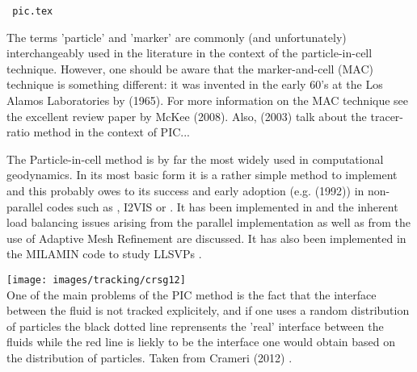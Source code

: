 \begin{flushright} {\tiny \tt {\color{gray} pic.tex}} \end{flushright}

\begin{remark}
The terms 'particle' and 'marker' are commonly (and unfortunately) interchangeably used in the literature 
in the context of the particle-in-cell technique. However, one should be aware that the marker-and-cell (MAC) 
technique is something different: it was invented in the early 60's at the Los Alamos Laboratories by 
\textcite{hawe65} (1965). For more information on the MAC technique see the excellent review paper 
by McKee \textcite{mctf08} (2008). 
Also, \textcite{taki03} (2003) talk about the tracer-ratio method in the context of PIC... 
\end{remark}

The Particle-in-cell method is by far the most widely used in computational geodynamics. 
In its most basic form it is a rather simple method to implement and this probably owes to its success
and early adoption (e.g. \textcite{popo92} (1992))  in non-parallel codes such as \sopale \cite{full95}, 
I2VIS \cite{geyu03} or \citcoms \cite{mczh04}.
It has been implemented in \aspect{} \cite{galh18} and the inherent load balancing issues arising from the 
parallel implementation as well as from the use of Adaptive Mesh Refinement are discussed. 
It has also been implemented in the MILAMIN code \cite{daks08} to study LLSVPs \cite{musd15}.

\begin{center}
\texttt{[image: images/tracking/crsg12]}\\
{\captionfont One of the main problems of the PIC method is the fact that the interface 
between the fluid is not tracked explicitely, and if one uses a random distribution of 
particles the black dotted line reprensents the 'real' interface between the fluids 
while the red line is liekly to be the interface one would obtain based on the 
distribution of particles. Taken from Crameri \etal (2012) \cite{crsg12}.}
\end{center}

